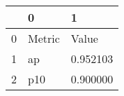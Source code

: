 \begin{tabular}{lll}
\toprule
 & 0 & 1 \\
\midrule
0 & Metric & Value \\
1 & ap & 0.952103 \\
2 & p10 & 0.900000 \\
\bottomrule
\end{tabular}
